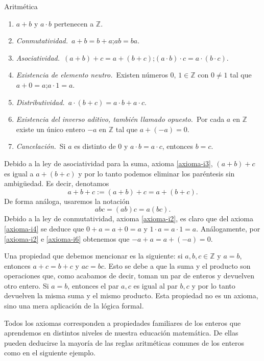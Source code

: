 \begin{section}{Aritmética}
\begin{enumerate}[label=\textbf{I\arabic*)}, ref=\textbf{I\arabic*}]
\item \label{axioma-i1} $a+b$ y $a\cdot b$ pertenecen a ${\mathbb Z}$.
\item \label{axioma-i2} {\em Conmutatividad.}\, $a+b = b+a$;\qquad $ab=ba$. 
\item \label{axioma-i3} {\em Asociatividad.}\, $(a+b)+c = a+(b+c)$;\qquad $(a\cdot b)\cdot c = a\cdot (b\cdot c)$. 
\item \label{axioma-i4} {\em Existencia de elemento neutro.}\, Existen números $0$, $1 \in \mathbb Z$ con $0\not=1$ tal que $a+0=a$;\qquad $a\cdot 1=a$. 
\item \label{axioma-i5} {\em Distributividad.}\, $a\cdot (b+c)=a\cdot b+a\cdot c$. 
\item \label{axioma-i6} {\em Existencia del inverso aditivo, también llamado opuesto.}\, Por cada $a$ en ${\mathbb Z}$ existe un único entero $-a$ en ${\mathbb Z}$ tal que $a+(-a)=0$. 
\item \label{axioma-i7} {\em Cancelación.}\, Si $a$ es distinto de $0$ y $a\cdot b=a\cdot c$, entonces $b=c$. 
\end{enumerate}


Debido a la ley de asociatividad para la suma, axioma \ref{axioma-i3}, $(a+b)+c$ es igual a $a+(b+c)$ y por lo tanto podemos eliminar los paréntesis sin ambigüedad. Es decir, denotamos
$$
a+b+c := (a+b)+c = a+(b+c).
$$
De forma análoga, usaremos la notación
$$
abc = (ab)c = a(bc).
$$
Debido a la ley de conmutatividad, axioma \ref{axioma-i2}, es claro que  del axioma \ref{axioma-i4} se deduce que  $0+a=a+0=a$ y $1\cdot a = a\cdot 1=a$. Análogamente,  por  \ref{axioma-i2} e  \ref{axioma-i6} obtenemos que  $-a+a =    a+(-a)=0$.

Una propiedad que debemos mencionar es la siguiente: si $a,b, c \in \mathbb Z$  y $a=b$, entonces $a+c = b+c$ y $ac = bc$. Esto se debe a que la suma y el producto son operaciones que, como acabamos de decir, toman un par de enteros y  devuelven otro entero. Si $a=b$, entonces el  par $a,c$ es igual al par $b,c$ y por lo tanto devuelven la misma suma y el mismo producto. Esta propiedad no es un axioma, sino  una mera aplicación de la lógica formal. 
  
Todos los axiomas corresponden a propiedades familiares de los  enteros que aprendemos en distintos niveles de nuestra educación  matemática. De ellas pueden deducirse la mayoría de las reglas  aritméticas comunes de los enteros como en el siguiente ejemplo.


\end{section}
